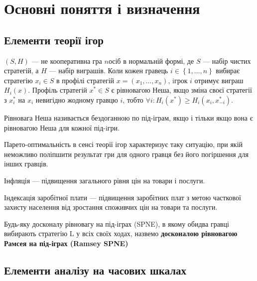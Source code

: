 \section{Основні поняття і визначення}
\subsection{Елементи теорії ігор}

\begin{definition}
	$(S,H)$ --- не кооперативна гра $n$осіб в нормальній
	формі, де $S$ --- набір чистих стратегій, а $H$ --- набір виграшів. Коли кожен гравець $i \in \left\{1,\dots,n\right\}$ вибирає стратегію $x_i
	\in S$ в профілі стратегій $x=(x_1,\dots,x_n)$, iгрок $i$ отримує
	виграш $H_i(x)$. Профіль стратегій $x^* \in S$ є рівновагою
	Неша, якщо зміна своєї стратегії з $x_i^*$  на $x_i$ невигідно жодному гравцю  $i$, тобто $\forall i : H_i(x^*) \geqslant H_i(x_i,
	x_{-i}^*)$.
\end{definition}
	
\begin{definition}
Рівновага Неша називається бездоганною по під-іграм, якщо і тільки якщо вона
є рівновагою Неша для кожної під-iгри.
\end{definition}

\begin{definition}
Парето-оптимальність в сенсі теорії ігор характеризує таку ситуацію, при якій неможливо поліпшити результат гри для одного гравця без його погіршення для інших гравців.
\end{definition}

\begin{definition}
Інфляція --- підвищення загального рівня цін на товари і послуги.
\end{definition}

\begin{definition}
Індексація заробітної плати --- підвищення заробітних плат з метою часткової захисту населення від зростання споживчих цін на товари та послуги.\end{definition}

\begin{definition}
	Будь-яку досконалу рівновагу на під-іграх (SPNE), 
	 в якому обидва гравці вибирають стратегію L у всіх своїх ходах, назвемо \textbf {досконалою рівновагою Рамсея на під-іграх (Ramsey SPNE)}~\cite{libich2008macroeconomic}
\end{definition}

\subsection{Елементи аналізу на часових шкалах}

